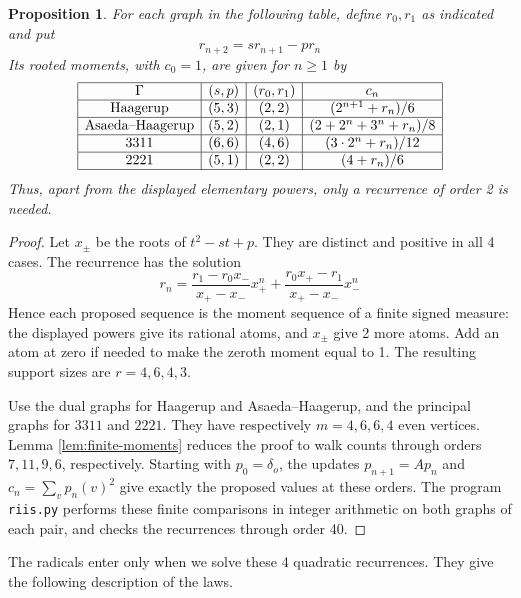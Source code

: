 \documentclass[11pt,reqno]{amsart}
\newtheorem{prop}[thm]{Proposition}
\theoremstyle{definition}
\numberwithin{equation}{section}
\begin{document}
\begin{prop}\label{prop:four-moments}
For each graph in the following table, define $r_0,r_1$ as indicated and put
$$r_{n+2}=sr_{n+1}-pr_n$$
Its rooted moments, with $c_0=1$, are given for $n\geq1$ by
$$\begin{array}{|c|c|c|c|}\hline
\Gamma&(s,p)&(r_0,r_1)&c_n\\\hline
{\rm Haagerup}&(5,3)&(2,2)&(2^{n+1}+r_n)/6\\\hline
\mbox{Asaeda--Haagerup}&(5,2)&(2,1)&(2+2^n+3^n+r_n)/8\\\hline
3311&(6,6)&(4,6)&(3\cdot2^n+r_n)/12\\\hline
2221&(5,1)&(2,2)&(4+r_n)/6\\\hline
\end{array}$$
Thus, apart from the displayed elementary powers, only a recurrence of order 2 is needed.
\end{prop}
\begin{proof}
Let $x_\pm$ be the roots of $t^2-st+p$. They are distinct and positive in all 4 cases. The recurrence has the solution
$$r_n=\frac{r_1-r_0x_-}{x_+-x_-}x_+^n+\frac{r_0x_+-r_1}{x_+-x_-}x_-^n$$
Hence each proposed sequence is the moment sequence of a finite signed measure: the displayed powers give its rational atoms, and $x_\pm$ give 2 more atoms. Add an atom at zero if needed to make the zeroth moment equal to 1. The resulting support sizes are $r=4,6,4,3$.

Use the dual graphs for Haagerup and Asaeda--Haagerup, and the principal graphs for $3311$ and $2221$. They have respectively $m=4,6,6,4$ even vertices. Lemma \ref{lem:finite-moments} reduces the proof to walk counts through orders $7,11,9,6$, respectively. Starting with $p_0=\delta_o$, the updates $p_{n+1}=Ap_n$ and $c_n=\sum_vp_n(v)^2$ give exactly the proposed values at these orders. The program \texttt{riis.py} performs these finite comparisons in integer arithmetic on both graphs of each pair, and checks the recurrences through order 40.
\end{proof}

The radicals enter only when we solve these 4 quadratic recurrences. They give the following description of the laws.
\end{document}
